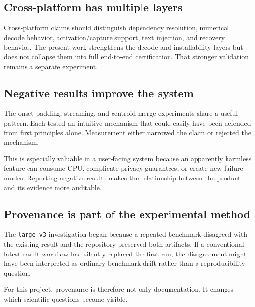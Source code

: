 \subsection{Cross-platform has multiple layers}

Cross-platform claims should distinguish dependency resolution, numerical decode behavior,
activation/capture support, text injection, and recovery behavior. The present work strengthens
the decode and installability layers but does not collapse them into full end-to-end
certification. That stronger validation remains a separate experiment.

\subsection{Negative results improve the system}

The onset-padding, streaming, and centroid-merge experiments share a useful pattern. Each tested
an intuitive mechanism that could easily have been defended from first principles alone.
Measurement either narrowed the claim or rejected the mechanism.

This is especially valuable in a user-facing system because an apparently harmless feature can
consume CPU, complicate privacy guarantees, or create new failure modes. Reporting negative
results makes the relationship between the product and its evidence more auditable.

\subsection{Provenance is part of the experimental method}

The \texttt{large-v3} investigation began because a repeated benchmark disagreed with the
existing result and the repository preserved both artifacts. If a conventional latest-result
workflow had silently replaced the first run, the disagreement might have been interpreted as
ordinary benchmark drift rather than a reproducibility question.

For this project, provenance is therefore not only documentation. It changes which scientific
questions become visible.
